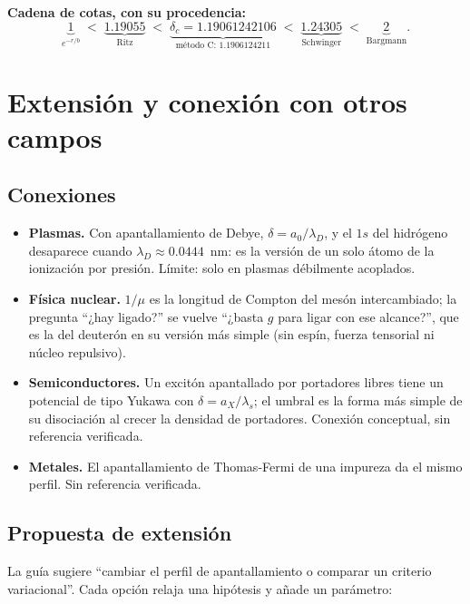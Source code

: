 \documentclass[11pt]{article}
\newcommand{\dc}{\delta_c}
\begin{document}
\textbf{Cadena de cotas, con su procedencia:}
\[
\underbrace{1}_{e^{-r/b}}\;<\;\underbrace{1.19055}_{\text{Ritz}}\;<\;\underbrace{\dc=1.19061242106}_{\text{método C: }1.1906124211}\;<\;\underbrace{1.24305}_{\text{Schwinger}}\;<\;\underbrace{2}_{\text{Bargmann}}.
\]

\section{Extensión y conexión con otros campos}
\label{sec:extension}

\subsection{Conexiones}

\begin{itemize}
\item \textbf{Plasmas.} Con apantallamiento de Debye, $\delta=a_0/\lambda_D$, y el $1s$ del hidrógeno desaparece cuando $\lambda_D\approx0.0444$~nm: es la versión de un solo átomo de la ionización por presión. Límite: solo en plasmas débilmente acoplados.
\item \textbf{Física nuclear.} $1/\mu$ es la longitud de Compton del mesón intercambiado; la pregunta ``¿hay ligado?'' se vuelve ``¿basta $g$ para ligar con ese alcance?'', que es la del deuterón en su versión más simple (sin espín, fuerza tensorial ni núcleo repulsivo).
\item \textbf{Semiconductores.} Un excitón apantallado por portadores libres tiene un potencial de tipo Yukawa con $\delta=a_X/\lambda_s$; el umbral es la forma más simple de su disociación al crecer la densidad de portadores. Conexión conceptual, sin referencia verificada.
\item \textbf{Metales.} El apantallamiento de Thomas-Fermi de una impureza da el mismo perfil. Sin referencia verificada.
\end{itemize}

\subsection{Propuesta de extensión}

La guía sugiere ``cambiar el perfil de apantallamiento o comparar un criterio variacional''. Cada opción relaja una hipótesis y añade un parámetro:
\end{document}
